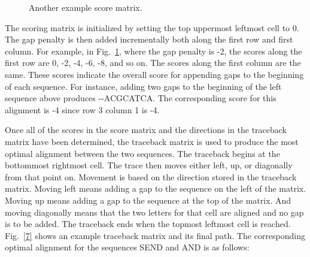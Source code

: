 \documentclass[conference]{IEEEtran}
\begin{document}
\begin{figure}[htbp]
\centerline{}
\caption{Another example score matrix. \cite{musso}}
\label{6}
\end{figure}

The scoring matrix is initialized by setting the top uppermost leftmost cell to 0. The gap penalty is then added incrementally both along the first row and first column. For example, in Fig.~\ref{6}, where the gap penalty is -2, the scores along the first row are 0, -2, -4, -6, -8, and so on. The scores along the first column are the same. These scores indicate the overall score for appending gaps to the beginning of each sequence. For instance, adding two gaps to the beginning of the left sequence above produces -{}-ACGCATCA. The corresponding score for this alignment is -4 since row 3 column 1 is -4.

Once all of the scores in the score matrix and the directions in the traceback matrix have been determined, the traceback matrix is used to produce the most optimal alignment between the two sequences. The traceback begins at the bottommost rightmost cell. The trace then moves either left, up, or diagonally from that point on. Movement is based on the direction stored in the traceback matrix. Moving left means adding a gap to the sequence on the left of the matrix. Moving up means adding a gap to the sequence at the top of the matrix. And moving diagonally means that the two letters for that cell are aligned and no gap is to be added. The traceback ends when the topmost leftmost cell is reached. Fig.~\ref{7} shows an example traceback matrix and its final path. The corresponding optimal alignment for the sequences SEND and AND is as follows:\\
 
\end{document}
